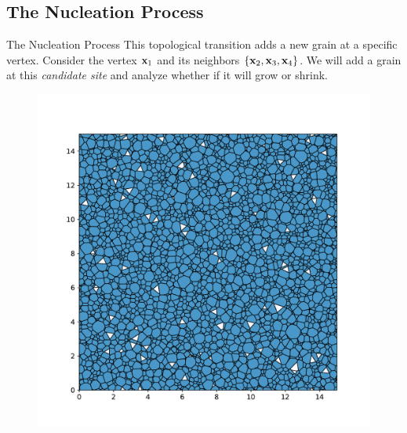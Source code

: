 \documentclass[usenames,dvipsnames]{beamer}
\begin{document}
\subsection{The Nucleation Process}
\begin{frame}{The Nucleation Process}
    This topological transition adds a new grain at a specific vertex. Consider the vertex $\x_1$ and its neighbors $\{\x_2, \x_3, \x_4\}$. We will add a grain at this \emph{candidate site} and analyze whether if it will grow or shrink.
    \begin{figure}[t]
    \centering
    \begin{minipage}{0.5\textwidth}
        \centering
        \includegraphics[trim={8cm 8cm 8cm 8cm},clip=true,scale=0.8]{figures/stored_energy/SE/snaps/000070.pdf}
    \end{minipage}%
    \begin{minipage}{0.5\textwidth}
        \centering
\end{minipage}
\end{figure}
\end{frame}
\end{document}
